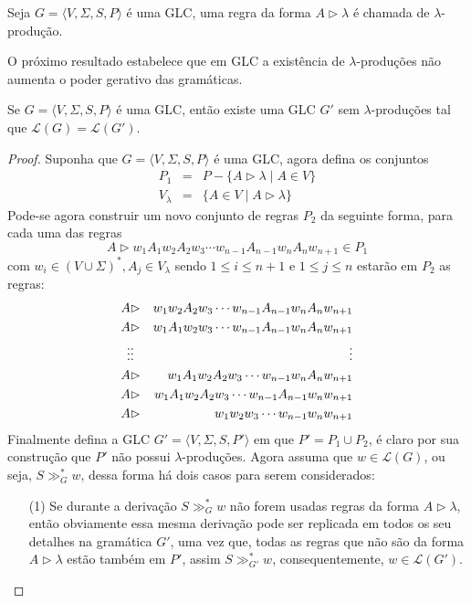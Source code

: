 \begin{definition}
    Seja $G = \langle V, \Sigma, S, P\rangle$ é uma GLC, uma regra da forma $A \rhd \lambda$ é chamada de $\lambda$-produção. 
\end{definition}

O próximo resultado estabelece que em GLC a existência de $\lambda$-produções não aumenta o poder gerativo das gramáticas.

\begin{theorem}\label{teo:SemLambdaProducoes}
    Se $G = \langle V, \Sigma, S, P\rangle$ é uma GLC, então existe uma GLC $G'$ sem $\lambda$-produções tal que $\mathcal{L}(G) = \mathcal{L}(G')$.
\end{theorem}

\begin{proof}
    Suponha que $G = \langle V, \Sigma, S, P\rangle$ é uma GLC, agora defina os conjuntos 
    \begin{eqnarray*}
        P_1  & = &  P - \{A \rhd \lambda \mid A \in V\}\\
        V_\lambda & = &  \{A \in V \mid A \rhd \lambda\}
    \end{eqnarray*}
    Pode-se agora construir um novo conjunto de regras $P_2$ da seguinte forma,  para cada uma das regras
    $$A \rhd w_1A_1w_2A_2w_3\cdots w_{n-1}A_{n-1}w_{n}A_nw_{n+1} \in P_1$$
    com $w_i \in (V \cup \Sigma)^*, A_j \in V_\lambda$ sendo $1 \leq i \leq n+1$ e $1 \leq j \leq n$ estarão em $P_2$ as regras:
    \begin{eqnarray*}
        A & \rhd & w_1w_2A_2w_3\cdots w_{n-1}A_{n-1}w_{n}A_nw_{n+1}\\
        A & \rhd & w_1A_1w_2w_3\cdots w_{n-1}A_{n-1}w_{n}A_nw_{n+1}\\
        \vdots & \vdots & \hspace{2.7cm} \vdots\\
        A & \rhd & w_1A_1w_2A_2w_3\cdots w_{n-1}w_{n}A_nw_{n+1}\\
        A & \rhd & w_1A_1w_2A_2w_3\cdots w_{n-1}A_{n-1}w_{n}w_{n+1}\\
        A & \rhd & w_1w_2w_3\cdots w_{n-1}w_{n}w_{n+1} 
    \end{eqnarray*}
    Finalmente defina a GLC $G' = \langle V, \Sigma, S, P' \rangle$ em que $P' = P_1 \cup P_2$, é claro por sua construção que $P'$ não possui $\lambda$-produções. Agora assuma que $w \in \mathcal{L}(G)$, ou seja, $S \gg_G^* w$, dessa forma há dois casos para serem considerados:
    \begin{itemize}
        \item[(1)] Se durante a derivação $S \gg_G^* w$ não forem usadas regras da forma $A \rhd \lambda$, então obviamente essa mesma derivação pode ser replicada em todos os seu detalhes na gramática $G'$, uma vez que, todas as regras que não são da forma $A \rhd \lambda$ estão também em $P'$, assim $S \gg_{G'}^* w$, consequentemente, $w \in \mathcal{L}(G')$.

\end{itemize}
\end{proof}
